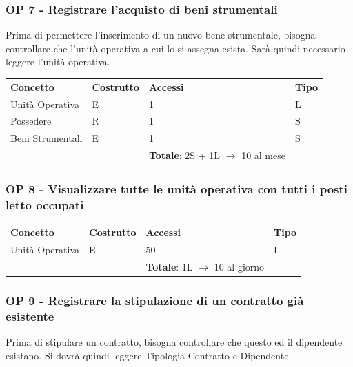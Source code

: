 \documentclass[a4paper, 12pt]{report}
\begin{document}
\subsubsection*{OP 7 - Registrare l'acquisto di beni strumentali}
Prima di permettere l'inserimento di un nuovo bene strumentale, bisogna controllare che l'unità operativa a
cui lo si assegna esista. Sarà quindi necessario leggere l'unità operativa. \par
\bigskip
\noindent
\begin{tabularx}{\textwidth}{XlXl}
        \rowcolor{seaGreen}
        \textbf{Concetto} & \textbf{Costrutto} & \textbf{Accessi} & \textbf{Tipo} \\
        Unità Operativa & E & 1 & L \\
        \hline
        Possedere & R & 1 & S \\
        \hline
        Beni Strumentali & E & 1 & S \\
        \rowcolor{seaGreen}
         &  & \textbf{Totale}: 2S + 1L $\rightarrow$ 10 al mese & \\
\end{tabularx}

\subsubsection*{OP 8 - Visualizzare tutte le unità operativa con tutti i posti letto occupati}
\begin{tabularx}{\textwidth}{XlXl}
        \rowcolor{seaGreen}
        \textbf{Concetto} & \textbf{Costrutto} & \textbf{Accessi} & \textbf{Tipo} \\
        Unità Operativa & E & 50 & L \\
        \rowcolor{seaGreen}
         &  & \textbf{Totale}: 1L $\rightarrow$ 10 al giorno & \\
\end{tabularx}

\subsubsection*{OP 9 - Registrare la stipulazione di un contratto già esistente}
Prima di stipulare un contratto, bisogna controllare che questo ed il dipendente esistano. 
Si dovrà quindi leggere Tipologia Contratto e Dipendente. \par
\end{document}
